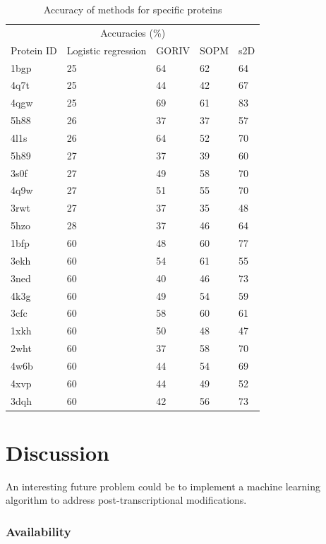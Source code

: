 \documentclass{article}
\begin{document}
\begin{table}[t]
  \caption{Accuracy of methods for specific proteins}
  \centering
  \begin{tabular}{lllll}
    \toprule
    \multicolumn{5}{c}{Accuracies (\%)}\\
    \cmidrule{2-5}
    Protein ID & Logistic regression & GORIV & SOPM & s2D\\
    \midrule
    1bgp & 25 & 64&62&64 \\
    4q7t & 25 & 44 & 42 & 67 \\
    4qgw & 25 & 69 & 61 & 83 \\
    5h88 & 26 & 37&37&57 \\
    4l1s & 26 & 64&52&70 \\
    
    5h89 & 27 & 37&39&60 \\
    3s0f & 27 & 49 & 58 & 70 \\
    4q9w & 27 & 51&55&70 \\
    3rwt & 27 & 37&35&48 \\
    5hzo & 28 & 37 & 46 & 64 \\
    \midrule
    1bfp & 60 & 48&60&77 \\
    3ekh & 60 & 54&61&55 \\
    3ned & 60 & 40&46&73 \\
    4k3g & 60 & 49&54&59 \\
    3cfc & 60 & 58 &60&61 \\
    
    1xkh & 60 & 50&48&47 \\
    2wht & 60 & 37&58&70 \\
    4w6b & 60 & 44&54&69 \\
    4xvp & 60 & 44&49&52 \\
    3dqh & 60 & 42&56&73 \\
    \bottomrule
  \end{tabular}
\end{table}

\section{Discussion}

An interesting future problem could be to implement a machine learning algorithm to address post-transcriptional modifications. 


\subsubsection*{Availability}
\end{document}
